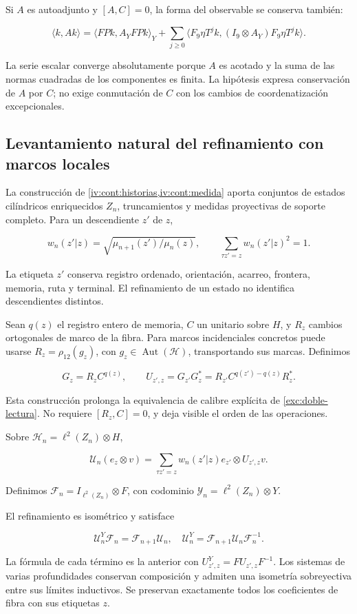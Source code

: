 Si \(A\) es autoadjunto y \([A,C]=0\), la forma del observable se conserva también:

\[
\langle k,Ak\rangle
=\langle FPk,A_YFPk\rangle_Y
+\sum_{j\ge0}\langle F_9\eta T^jk,(I_9\otimes A_Y)F_9\eta T^jk\rangle.
\]

La serie escalar converge absolutamente porque \(A\) es acotado y la suma de las normas cuadradas de los componentes es finita. La hipótesis expresa conservación de \(A\) por \(C\); no exige conmutación de \(C\) con los cambios de coordenatización excepcionales.

\subsection{Levantamiento natural del refinamiento con marcos locales}\label{nuc05:refinamiento}

La construcción de \cref{iv:cont:historias,iv:cont:medida} aporta conjuntos de estados cilíndricos enriquecidos \(Z_n\), truncamientos y medidas proyectivas de soporte completo. Para un descendiente \(z'\) de \(z\),

\[
w_n(z'|z)=\sqrt{\mu_{n+1}(z')/\mu_n(z)},\qquad
\sum_{\tau z'=z}w_n(z'|z)^2=1.
\]

La etiqueta \(z'\) conserva registro ordenado, orientación, acarreo, frontera, memoria, ruta y terminal. El refinamiento de un estado no identifica descendientes distintos.

Sean \(q(z)\) el registro entero de memoria, \(C\) un unitario sobre \(H\), y \(R_z\) cambios ortogonales de marco de la fibra. Para marcos incidenciales concretos puede usarse \(R_z=\rho_{12}(g_z)\), con \(g_z\in\operatorname{Aut}(\mathcal H)\), transportando sus marcas. Definimos

\[
G_z=R_zC^{q(z)},\qquad
U_{z',z}=G_{z'}G_z^*
=R_{z'}C^{q(z')-q(z)}R_z^*.
\]

Esta construcción prolonga la equivalencia de calibre explícita de \cref{exc:doble-lectura}. No requiere \([R_z,C]=0\), y deja visible el orden de las operaciones.

Sobre \(\mathscr H_n=\ell^2(Z_n)\otimes H\),

\[
\mathscr U_n(e_z\otimes v)
=\sum_{\tau z'=z}w_n(z'|z)e_{z'}\otimes U_{z',z}v.
\]

Definimos \(\mathscr F_n=I_{\ell^2(Z_n)}\otimes F\), con codominio \(\mathscr Y_n=\ell^2(Z_n)\otimes Y\).

\begin{theorem}
El refinamiento es isométrico y satisface

\[
\mathscr U^Y_n\mathscr F_n=\mathscr F_{n+1}\mathscr U_n,
\quad
\mathscr U^Y_n=\mathscr F_{n+1}\mathscr U_n\mathscr F_n^{-1}.
\]

La fórmula de cada término es la anterior con \(U^Y_{z',z}=FU_{z',z}F^{-1}\). Los sistemas de varias profundidades conservan composición y admiten una isometría sobreyectiva entre sus límites inductivos. Se preservan exactamente todos los coeficientes de fibra con sus etiquetas \(z\).
\end{theorem}

